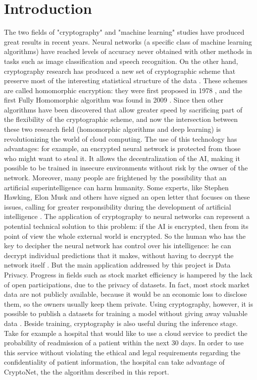\section{Introduction}

The two fields of "cryptography" and "machine learning" studies have produced great results in recent years. Neural networks (a specific class of machine learning algorithms) have reached levels of accuracy never obtained with other methods in tasks such as image classification and speech recognition. On the other hand, cryptography research has produced a new set of cryptographic scheme that preserve most of the interesting statistical structure of the data \cite{safeai}. These schemes are called homomorphic encryption: they were first proposed in 1978 \cite{firstHomEnc}, and the first Fully Homomorphic algorithm was found in 2009 \cite{10.1007/978-3-642-29011-4_28}. Since then other algorithms have been discovered that allow greater speed by sacrificing part of the flexibility of the cryptographic scheme, and now the intersection between these two research field (homomorphic algorithms and deep learning) is revolutionizing the world of cloud computing. The use of this technology has advantages: for example, an encrypted neural network is protected from those who might want to steal it. It allows the decentralization of the AI, making it possible to be trained in insecure environments without risk by the owner of the network. Moreover, many people are frightened by the possibility that an artificial superintelligence can harm humanity. Some experts, like Stephen Hawking, Elon Musk and others have signed an open letter that focuses on these issues, calling for greater responsibility during the development of artificial intelligence \cite{open-letter}. The application of cryptography to neural networks can represent a potential technical solution to this problem: if the AI is encrypted, then from its point of view the whole external world is encrypted. So the human who has the key to decipher the neural network has control over his intelligence: he can decrypt individual predictions that it makes, without having to decrypt the network itself \cite{safeai}. But the main application addressed by this project is Data Privacy. Progress in fields such as stock market efficiency is hampered by the lack of open participations, due to the privacy of datasets. In fact, most stock market data are not publicly available, because it would be an economic loss to disclose them, so the owners usually keep them private. Using cryptography, however, it is possible to publish a datasets for training a model without giving away valuable data \cite{numerai}. Beside training, cryptography is also useful during the inference stage. Take for example a hospital that would like to use a cloud service to predict the probability of readmission of a patient within the next 30 days. In order to use this service without violating the ethical and legal requirements regarding the confidentiality of patient information, the hospital can take advantage of CryptoNet, the the algorithm described in this report.

